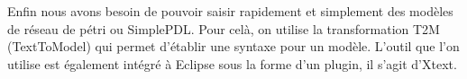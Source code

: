 Enfin nous avons besoin de pouvoir saisir rapidement et simplement des modèles de réseau de pétri ou SimplePDL.
Pour celà, on utilise la transformation T2M (TextToModel) qui permet d'établir une syntaxe pour un modèle.
L'outil que l'on utilise est également intégré à Eclipse sous la forme d'un plugin, il s'agit d'Xtext.
